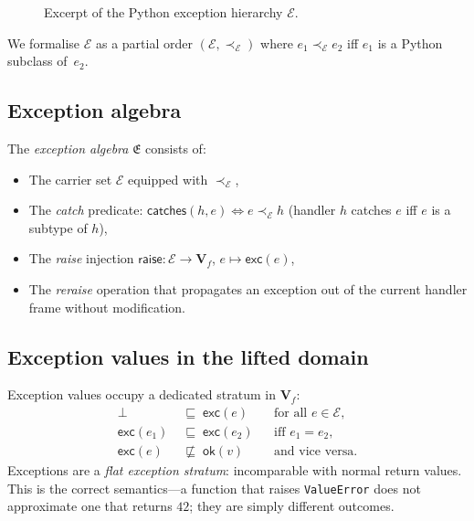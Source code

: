 \documentclass[11pt]{article}
\newcommand{\Apx}{\sqsubseteq}              %
\newcommand{\POK}[1]{\mathsf{ok}(#1)}      %
\newcommand{\PExc}[1]{\mathsf{exc}(#1)}    %
\newcommand{\PVal}{\mathbf{V}}             %
\newcommand{\ExcH}{\mathcal{E}}            %
\newcommand{\ExcAlg}{\mathfrak{E}}         %
\newcommand{\ExcSub}{\prec_{\!\ExcH}}      %
\begin{document}
\begin{figure}[ht]
\centering
{}
\caption{Excerpt of the Python exception hierarchy $\ExcH$.}
\label{fig:exc-hier}
\end{figure}

We formalise $\ExcH$ as a partial order $(\ExcH, \ExcSub)$ where
$e_1 \ExcSub e_2$ iff $e_1$ is a Python subclass of~$e_2$.

\subsection{Exception algebra}

\begin{definition}\label{def:exc-alg}
The \emph{exception algebra} $\ExcAlg$ consists of:
\begin{itemize}
  \item The carrier set $\ExcH$ equipped with $\ExcSub$,
  \item The \emph{catch} predicate: $\mathsf{catches}(h, e)
        \Leftrightarrow e \ExcSub h$ (handler $h$ catches $e$ iff $e$
        is a subtype of $h$),
  \item The \emph{raise} injection $\mathsf{raise}: \ExcH \to \PVal_f$,
        $e \mapsto \PExc{e}$,
  \item The \emph{reraise} operation that propagates an exception out
        of the current handler frame without modification.
\end{itemize}
\end{definition}

\subsection{Exception values in the lifted domain}

Exception values occupy a dedicated stratum in $\PVal_f$:
\begin{align*}
  \bot
    &\;\Apx\; \PExc{e}
    && \text{for all } e \in \ExcH, \\
  \PExc{e_1}
    &\;\Apx\; \PExc{e_2}
    && \text{iff } e_1 = e_2, \\
  \PExc{e}
    &\;\not\Apx\; \POK{v}
    && \text{and vice versa.}
\end{align*}
Exceptions are a \emph{flat exception stratum}: incomparable with
normal return values.  This is the correct semantics---a function that
raises \texttt{ValueError} does not approximate one that returns
$42$; they are simply different outcomes.
\end{document}
